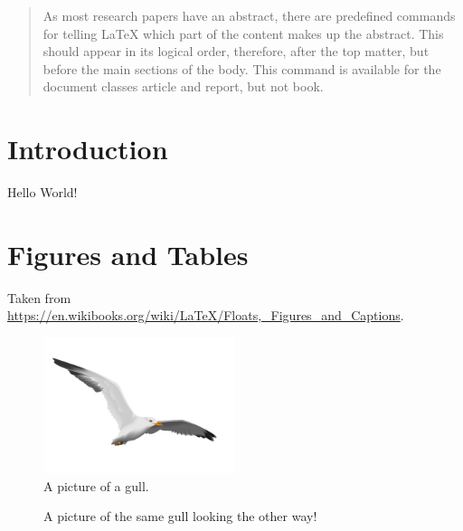 


    \begin{abstract}
        As most research papers have an abstract, there are predefined commands for telling LaTeX which part of the content makes up the abstract.
        This should appear in its logical order, therefore, after the top matter, but before the main sections of the body.
        This command is available for the document classes article and report, but not book.
    \end{abstract}

    \section{Introduction}
    Hello World!

    \section{Figures and Tables}
        Taken from \url{https://en.wikibooks.org/wiki/LaTeX/Floats,_Figures_and_Captions}.

        \begin{figure}
          \caption{A picture of a gull.}
          \centering
            \includegraphics[width=0.5\textwidth]{gull}
        \end{figure}

        \begin{figure}
          \centering
          \caption{A picture of the same gull looking the other way!}
        \end{figure}

